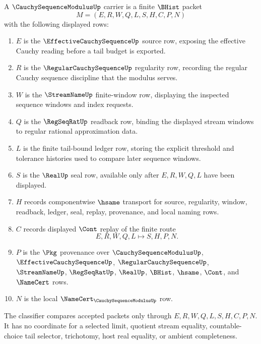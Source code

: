 \begin{definition}
\label{def:cauchy-sequence-modulus-carrier}
A $\CauchySequenceModulusUp$ carrier is a finite $\BHist$ packet
$$
M=(E,R,W,Q,L,S,H,C,P,N)
$$
with the following displayed rows:
\begin{enumerate}
\item $E$ is the $\EffectiveCauchySequenceUp$ source row, exposing the effective Cauchy reading before a tail budget is exported.
\item $R$ is the $\RegularCauchySequenceUp$ regularity row, recording the regular Cauchy sequence discipline that the modulus serves.
\item $W$ is the $\StreamNameUp$ finite-window row, displaying the inspected sequence windows and index requests.
\item $Q$ is the $\RegSeqRatUp$ readback row, binding the displayed stream windows to regular rational approximation data.
\item $L$ is the finite tail-bound ledger row, storing the explicit threshold and tolerance histories used to compare later sequence windows.
\item $S$ is the $\RealUp$ seal row, available only after $E,R,W,Q,L$ have been displayed.
\item $H$ records componentwise $\hsame$ transport for source, regularity, window, readback, ledger, seal, replay, provenance, and local naming rows.
\item $C$ records displayed $\Cont$ replay of the finite route
$$
E,R,W,Q,L \longmapsto S,H,P,N .
$$
\item $P$ is the $\Pkg$ provenance over $\CauchySequenceModulusUp$, $\EffectiveCauchySequenceUp$, $\RegularCauchySequenceUp$, $\StreamNameUp$, $\RegSeqRatUp$, $\RealUp$, $\BHist$, $\hsame$, $\Cont$, and $\NameCert$ rows.
\item $N$ is the local $\NameCert_{\CauchySequenceModulusUp}$ row.
\end{enumerate}
The classifier compares accepted packets only through $E,R,W,Q,L,S,H,C,P,N$. It has no coordinate for a selected limit, quotient stream equality, countable-choice tail selector, trichotomy, host real equality, or ambient completeness.
\end{definition}

